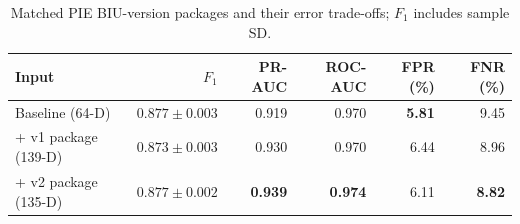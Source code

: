 \begin{table}[!htbp]
\centering

\caption{Matched PIE BIU-version packages and their error trade-offs; $F_1$ includes sample SD.}\label{tab:ch4_versions}
\begin{tabularx}{\textwidth}{@{}Xrrrrr@{}}\toprule
\textbf{Input} & \textbf{\boldmath $F_1$} & \textbf{PR-AUC} & \textbf{ROC-AUC} & \textbf{FPR (\%)} & \textbf{FNR (\%)} \\[3pt]
\midrule
Baseline (64-D) & $\mathbf{0.877}\pm0.003$ & 0.919 & 0.970 & \textbf{5.81} & 9.45\\[3pt]
+ v1 package (139-D) & $0.873\pm0.003$ & 0.930 & 0.970 & 6.44 & 8.96\\[3pt]
+ v2 package (135-D) & $\mathbf{0.877}\pm0.002$ & \textbf{0.939} & \textbf{0.974} & 6.11 & \textbf{8.82}\\[3pt]
\bottomrule
\end{tabularx}
\end{table}
